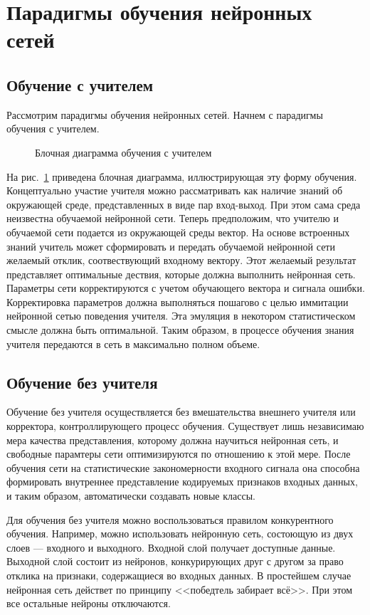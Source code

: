 \section{Парадигмы обучения нейронных сетей}

\subsection{Обучение с учителем}

Рассмотрим парадигмы обучения нейронных сетей.
Начнем с парадигмы обучения с учителем.

\begin{figure}[h]
\caption{Блочная диаграмма обучения с учителем}
\label{ris:WithTeacher}
\end{figure}

На рис.~\ref{ris:WithTeacher} приведена блочная диаграмма, иллюстрирующая эту форму обучения. 
Концептуально участие учителя можно рассматривать как наличие знаний об окружающей среде, представленных в виде пар вход-выход.
При этом сама среда неизвестна обучаемой нейронной сети.
Теперь предположим, что учителю и обучаемой сети подается  из окружающей среды вектор.
На основе встроенных знаний учитель может сформировать и передать обучаемой нейронной сети желаемый отклик, соотвествующий входному вектору.
Этот желаемый результат представляет оптимальные дествия, которые должна выполнить нейронная сеть.
Параметры сети корректируются с учетом обучающего вектора и сигнала ошибки.
Корректировка параметров должна выполняться пошагово с целью иммитации нейронной сетью поведения учителя.
Эта эмуляция в некотором статистическом смысле должна быть оптимальной.
Таким образом, в процессе обучения знания учителя передаются в сеть в максимально полном объеме.
 

\subsection{Обучение без учителя}

Обучение без учителя осуществляется без вмешательства внешнего учителя или корректора, контроллирующего процесс обучения.
Существует лишь независимаю мера качества представления, которому должна научиться нейронная сеть, и свободные парамтеры сети оптимизируются по отношению к этой мере.
После обучения сети на статистические закономерности входного сигнала она способна формировать внутреннее представление кодируемых признаков входных данных, и таким образом, автоматически создавать новые классы.

Для обучения без учителя можно воспользоваться правилом конкурентного обучения.
Например, можно использовать нейронную сеть, состоющую из двух слоев --- входного и выходного.
Входной слой получает доступные данные.
Выходной слой состоит из нейронов, конкурирующих друг с другом за право отклика на признаки, содержащиеся во входных данных.
В простейшем случае нейронная сеть действет по принципу <<победтель забирает всё>>.
При этом все остальные нейроны отключаются.